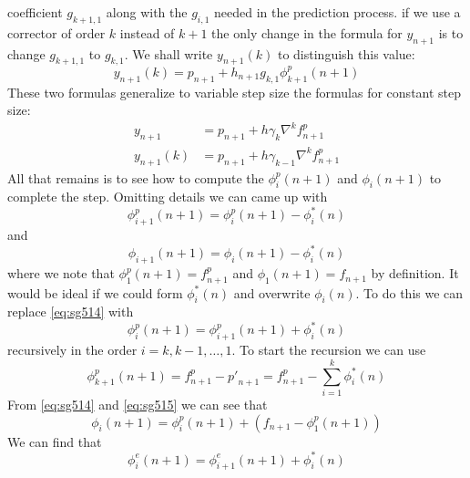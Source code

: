 coefficient $g_{k+1,1}$ along with the $g_{i,1}$ needed in the prediction process.
if we use a corrector of order $k$ instead of $k+1$ the only change in the formula 
for $y_{n+1}$ is to change $g_{k+1,1}$ to $g_{k,1}$. We shall write $y_{n+1}(k)$ 
to distinguish this value:
\begin{equation}
    y_{n+1}(k) = p_{n+1} + h_{n+1} g_{k,1} \phi ^{p}_{k+1} (n+1)
\end{equation}
These two formulas generalize to variable step size the formulas for constant step size:
\begin{equation}\label{eq:sg513}
    \begin{aligned}
        y_{n+1} &= p_{n+1} + h \gamma _k \nabla ^{k} f^{p}_{n+1} \\
        y_{n+1}(k) &= p_{n+1} + h \gamma _{k-1} \nabla ^{k} f^{p}_{n+1}
    \end{aligned}
\end{equation}
All that remains is to see how to compute the $\phi ^{p}_{i} (n+1)$ and 
$\phi _{i} (n+1)$ to complete the step.
Omitting details we can came up with
\begin{equation}\label{eq:sg514}
    \phi ^{p}_{i+1} (n+1) = \phi ^{p}_{i} (n+1) -  \phi ^{*}_{i} (n)
\end{equation}
and
\begin{equation}\label{eq:sg515}
    \phi _{i+1} (n+1) = \phi _{i} (n+1) -  \phi ^{*}_{i} (n)
\end{equation}
where we note that  $\phi ^{p}_{1} (n+1) = f^{p}_{n+1}$ and 
$\phi _{1} (n+1) = f_{n+1}$ by definition.
It would be ideal if we could form $\phi ^{*}_{i} (n)$ and overwrite $\phi _{i} (n)$. 
To do this we can replace \autoref{eq:sg514} with 
\begin{equation}\label{eq:sg516}
    \phi ^{p}_{i} (n+1) = \phi ^{p}_{i+1} (n+1) + \phi ^{*}_{i} (n)
\end{equation}
recursively in the order $i=k,k-1,\dots ,1$. To start the recursion we can use
\begin{equation}
    \phi ^{p}_{k+1} (n+1) = f^{p}_{n+1} - {p'}_{n+1} = 
    f^{p}_{n+1} - \sum_{i=1}^{k}\phi ^{*}_{i} (n)
\end{equation}
From \autoref{eq:sg514} and \autoref{eq:sg515} we can see that
\begin{equation}\label{eq:sg517}
    \phi _{i} (n+1) = \phi ^{p}_{i} (n+1) + \left( f_{n+1} - \phi ^{p}_{1} (n+1) \right)
\end{equation}
We can find that
\begin{equation}\label{eq:sg518}
    \phi ^{e}_{i} (n+1) = \phi ^{e}_{i+1} (n+1) + \phi ^{*}_{i} (n)
\end{equation}
